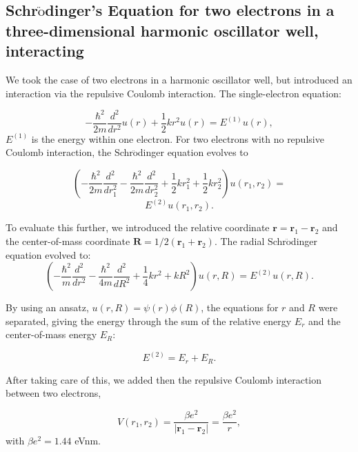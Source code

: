 \documentclass[%
reprint,
superscriptaddress,
showpacs,
nofootinbib,
bibnotes,amsmath,amssymb,aps,
prc, 
]{revtex4-1}
\begin{document}
\subsection{Schr$\ddot{\textrm{o}}$dinger's Equation for two electrons in a three-dimensional harmonic oscillator well, interacting}	
We took the case of two electrons in a harmonic oscillator well, but
introduced an interaction via the repulsive Coulomb interaction.
The single-electron equation:

\begin{equation*}
-\frac{\hbar^2}{2 m} \frac{d^2}{dr^2} u(r) 
+ \frac{1}{2}k r^2u(r)  = E^{(1)} u(r),
\end{equation*}
$E^{(1)}$ is the energy within one electron.
For two electrons with no repulsive Coulomb interaction, the
Schr$\ddot{\textrm{o}}$dinger equation evolves to

\begin{equation*}
\left(  -\frac{\hbar^2}{2 m} \frac{d^2}{dr_1^2} -\frac{\hbar^2}{2 m} \frac{d^2}{dr_2^2}+ \frac{1}{2}k r_1^2+ \frac{1}{2}k r_2^2\right)u(r_1,r_2)  =
\end{equation*}
\begin{equation*}
E^{(2)} u(r_1,r_2) .
\end{equation*}

To evaluate this further, we introduced the relative coordinate $\mathbf{r} = \mathbf{r}_1-\mathbf{r}_2$
and the center-of-mass coordinate $\mathbf{R} = 1/2(\mathbf{r}_1+\mathbf{r}_2)$.
The radial Schr$\ddot{\textrm{o}}$dinger equation evolved to:
\begin{equation*}
\left(  -\frac{\hbar^2}{m} \frac{d^2}{dr^2} -\frac{\hbar^2}{4 m} \frac{d^2}{dR^2}+ \frac{1}{4} k r^2+  kR^2\right)u(r,R)  = E^{(2)} u(r,R).
\end{equation*}

By using an ansatz, $u(r,R) = \psi(r)\phi(R)$, the equations for $r$ and $R$ were separated, giving the energy through the sum
of the relative energy $E_r$ and the center-of-mass energy $E_R$:

\begin{equation*}
E^{(2)}=E_r+E_R.
\end{equation*}

After taking care of this, we added then the repulsive Coulomb interaction between two electrons,

\begin{equation*}
V(r_1,r_2) = \frac{\beta e^2}{|\mathbf{r}_1-\mathbf{r}_2|}=\frac{\beta e^2}{r},
\end{equation*}
with $\beta e^2=1.44$ eVnm.
\end{document}
